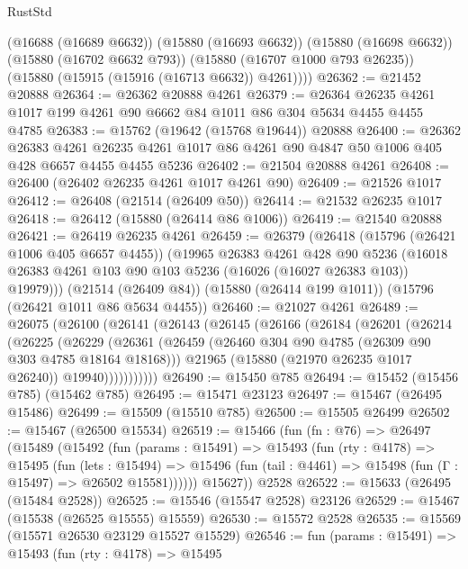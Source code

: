 \begin{lexlean}{RustStd}
\begin{coremodule}
        (@16688 (@16689 @6632))
        (@15880 (@16693 @6632))
        (@15880 (@16698 @6632))
        (@15880 (@16702 @6632 @793))
        (@15880 (@16707 @1000 @793 @26235))
        (@15880 (@15915 (@15916 (@16713 @6632)) @4261))))
@26362 := @21452 @20888
@26364 := @26362 @20888 @4261
@26379 := @26364 @26235 @4261 @1017 @199 @4261 @90 @6662 @84 @1011 @86 @304 @5634 @4455 @4455 @4785
@26383 := @15762 (@19642 (@15768 @19644)) @20888
@26400 := @26362
    @26383
    @4261
    @26235
    @4261
    @1017
    @86
    @4261
    @90
    @4847
    @50
    @1006
    @405
    @428
    @6657
    @4455
    @4455
    @5236
@26402 := @21504 @20888 @4261
@26408 := @26400 (@26402 @26235 @4261 @1017 @4261 @90)
@26409 := @21526 @1017
@26412 := @26408 (@21514 (@26409 @50))
@26414 := @21532 @26235 @1017
@26418 := @26412 (@15880 (@26414 @86 @1006))
@26419 := @21540 @20888
@26421 := @26419 @26235 @4261
@26459 := @26379
    (@26418
      (@15796 (@26421 @1006 @405 @6657 @4455))
      (@19965
        @26383
        @4261
        @428
        @90
        @5236
        (@16018 @26383 @4261 @103 @90 @103 @5236 (@16026 (@16027 @26383 @103)) @19979)))
    (@21514 (@26409 @84))
    (@15880 (@26414 @199 @1011))
    (@15796 (@26421 @1011 @86 @5634 @4455))
@26460 := @21027 @4261
@26489 := @26075
    (@26100
      (@26141
        (@26143
          (@26145
            (@26166
              (@26184
                (@26201
                  (@26214
                    (@26225
                      (@26229
                        (@26361
                          (@26459 (@26460 @304 @90 @4785 (@26309 @90 @303 @4785 @18164 @18168)))
                          @21965
                          (@15880 (@21970 @26235 @1017 @26240))
                          @19940)))))))))))
@26490 := @15450 @785
@26494 := @15452 (@15456 @785) (@15462 @785)
@26495 := @15471 @23123
@26497 := @15467 (@26495 @15486)
@26499 := @15509 (@15510 @785)
@26500 := @15505 @26499
@26502 := @15467 (@26500 @15534)
@26519 := @15466
    (fun (fn : @76) =>
    @26497
      (@15489
        (@15492
          (fun (params : @15491) =>
          @15493
            (fun (rty : @4178) =>
            @15495
              (fun (lets : @15494) =>
              @15496 (fun (tail : @4461) => @15498 (fun (Γ : @15497) => @26502 @15581))))))
        @15627))
    @2528
@26522 := @15633 (@26495 (@15484 @2528))
@26525 := @15546 (@15547 @2528) @23126
@26529 := @15467 (@15538 (@26525 @15555) @15559)
@26530 := @15572 @2528
@26535 := @15569 (@15571 @26530 @23129 @15527 @15529)
@26546 := fun (params : @15491) =>
  @15493
    (fun (rty : @4178) =>
    @15495

\end{coremodule}
\end{lexlean}
